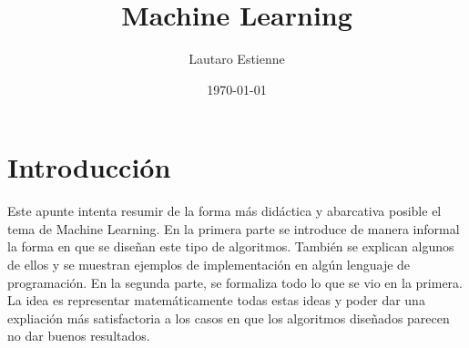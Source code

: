 \documentclass[a4 paper]{article}
\author{Lautaro Estienne}
\date{\today}
\title{Machine Learning}
\begin{document}
\maketitle

\section*{Introducción}

Este apunte intenta resumir de la forma más didáctica y abarcativa posible el tema de Machine Learning. En la primera parte se introduce de manera informal la forma en que se diseñan este tipo de algoritmos. También se explican algunos de ellos y se muestran ejemplos de implementación en algún lenguaje de programación. En la segunda parte, se formaliza todo lo que se vio en la primera. La idea es representar matemáticamente todas estas ideas y poder dar una expliación más satisfactoria a los casos en que los algoritmos diseñados parecen no dar buenos resultados.



\end{document}

